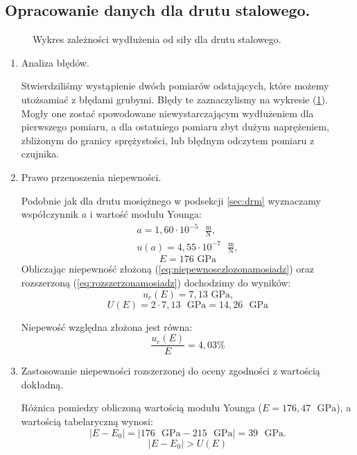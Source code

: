 \documentclass [a4paper,11pt]{article}
\begin{document}
	\subsection{Opracowanie danych dla drutu stalowego.}
	\begin{figure}[!h]
		\centering
		\caption{Wykres zależności wydłużenia od siły dla drutu stalowego.}
		\label{fig:wykstal}
	\end{figure}
	
	\begin{enumerate}[label=\alph*)]
		\item Analiza błędów.
		
		Stwierdziliśmy wystąpienie dwóch pomiarów odstających, które możemy utożsamiać z błędami grubymi. Błędy te zaznaczylismy na wykresie (\ref{fig:wykstal}). Mogły one zostać spowodowane niewystarczającym wydłużeniem dla pierwszego pomiaru, a dla ostatniego pomiaru zbyt dużym naprężeniem, zbliżonym do granicy sprężystości, lub błędnym odczytem pomiaru z czujnika.
		
		\item Prawo przenoszenia niepewności.
		
		Podobnie jak dla drutu mosiężnego w podsekcji \ref{sec:drm} wyznaczamy współczynnik $a$ i wartość modułu Younga:
		\begin{align}
		a = 1,60 \cdot 10^{-5} \text{ }\mathrm{\frac{m}{N}},\label{a} \\
		u(a) = 4,55 \cdot 10^{-7} \text{ }\mathrm{\frac{m}{N}},
		\end{align}
		$$ E = 176 \text{ GPa} $$
		Obliczając niepewność złożoną (\ref{eq:niepewnosczlozonamosiadz}) oraz rozszerzoną (\ref{eq:rozszerzonamosiadz}) dochodzimy do wyników: 
		$$ u_c(E) = 7,13 \text{ GPa,} $$
		$$ U(E) = 2 \cdot 7,13 \text{ }\mathrm{GPa} = 14,26 \text{ }\mathrm{GPa} $$
		
		Niepewość względna złożona jest równa:
		$$ \frac{u_c(E)}{E} = 4,03\% $$
		
		\item Zastosowanie niepewności rozszerzonej do oceny zgodności z wartością dokładną.
		
		Różnica pomiedzy obliczoną wartością modułu Younga ($E=176,47  \text{ }\mathrm{GPa}$), a wartością tabelaryczną wynosi:
		\begin{equation}
		\label{eq:roznicastal}
		|E - E_0| = \left|176 \text{ }\mathrm{GPa} - 215 \text{ }\mathrm{GPa}\right| = 39 \text{ }\mathrm{GPa}.
		\end{equation}
		$$
		|E - E_0| > U(E)
		$$
		
		
	\end{enumerate}
	
\end{document}
